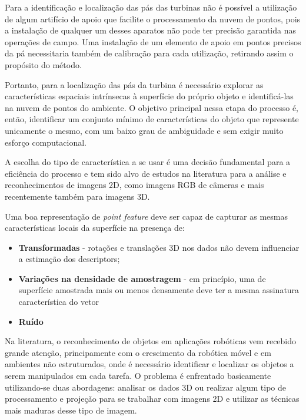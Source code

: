 Para a identificação e localização das pás das turbinas não é possível a
utilização de algum artifício de apoio que facilite o processamento da nuvem de
pontos, pois a instalação de qualquer um desses aparatos não pode ter precisão
garantida nas operações de campo. Uma instalação de um elemento de apoio em
pontos precisos da pá necessitaria também de calibração para cada utilização, retirando assim
o propósito do método. 

Portanto, para a localização das pás da turbina é
necessário explorar as características espaciais intrínsecas à superfície do
próprio objeto e identificá-las na nuvem de pontos do ambiente. O objetivo
principal nessa etapa do processo é, então, identificar um conjunto mínimo de
características do objeto que represente unicamente o mesmo, com um baixo grau
de ambiguidade e sem exigir muito esforço computacional. 

A escolha do tipo de característica a se usar é uma decisão fundamental para a
eficiência do processo e tem sido alvo de estudos na literatura para a análise
e reconhecimentos de imagens 2D, como imagens RGB de câmeras e mais recentemente
também para imagens 3D. 

Uma boa representação de \textit{point feature} deve ser capaz de capturar as
mesmas características locais da superfície na presença de:

\begin{itemize}
  \item \textbf{Transformadas} -  rotações e translações 3D nos dados não devem
  influenciar a estimação dos descriptors;
  \item \textbf{Variações na densidade de amostragem} - em princípio, uma de
  superfície amostrada mais ou menos densamente deve ter a mesma assinatura característica do vetor
  \item \textbf{Ruído}
\end{itemize}

Na literatura, o reconhecimento de objetos em aplicações robóticas vem recebido
grande atenção, principamente com o crescimento da robótica móvel e em ambientes
não estruturados, onde é necessário identificar e localizar os objetos a serem
manipulados em cada tarefa. O problema é enfrentado basicamente utilizando-se
duas abordagens: analisar os dados 3D ou realizar algum tipo de processamento e
projeção para se trabalhar com imagens 2D e utilizar as técnicas mais maduras
desse tipo de imagem.

